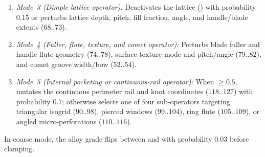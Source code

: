 \begin{itemize}[leftmargin=*,nosep]
\begin{enumerate}[leftmargin=*,nosep]
  \item \emph{Mode~3 (Dimple-lattice operator):} Deactivates the lattice () with probability $0.15$ or perturbs lattice depth, pitch, fill fraction, angle, and handle/blade extents ($68..73$).
  \item \emph{Mode~4 (Fuller, flute, texture, and comet operator):} Perturbs blade fuller and handle flute geometry ($74..78$), surface texture mode and pitch/angle ($79..82$), and comet groove width/bow ($52..54$).
  \item \emph{Mode~5 (Internal pocketing or continuous-rail operator):} When  $\ge 0.5$, mutates the continuous perimeter rail and knot coordinates ($118..127$) with probability $0.7$; otherwise selects one of four sub-operators targeting triangular isogrid ($90..98$), pierced windows ($99..104$), ring flute ($105..109$), or angled micro-perforations ($110..116$).
  \end{enumerate}
  In coarse mode, the alloy grade flips between  and  with probability $0.03$ before clamping.
\end{itemize}

